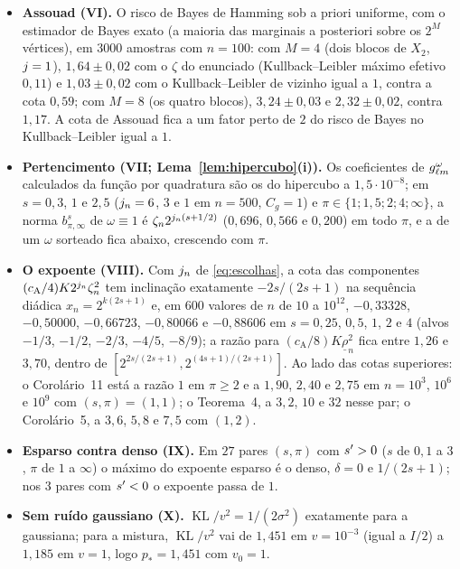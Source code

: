 \documentclass[11pt,a4paper]{article}
\newcommand{\rlow}{\underline{\rho}_{n}}
\newcommand{\cA}{c_{\mathrm{A}}}
\newcommand{\KL}{\operatorname{KL}}
\begin{document}
\begin{itemize}[nosep, leftmargin=*]
    longe de $\gamma/2 = 0{,}03$; a cota \eqref{eq:evento} não é posta à prova
    neste desenho.
  \item \textbf{Assouad (VI).} O risco de Bayes de Hamming sob a priori
    uniforme, com o estimador de Bayes exato (a maioria das marginais a
    posteriori sobre os $2^{M}$ vértices), em $3000$ amostras com $n = 100$:
    com $M = 4$ (dois blocos de $X_{2}$, $j = 1$), $1{,}64 \pm 0{,}02$ com o
    $\zeta$ do enunciado (Kullback--Leibler máximo efetivo $0{,}11$) e
    $1{,}03 \pm 0{,}02$ com o Kullback--Leibler de vizinho igual a $1$, contra a
    cota $0{,}59$; com $M = 8$ (os quatro blocos), $3{,}24 \pm 0{,}03$ e
    $2{,}32 \pm 0{,}02$, contra $1{,}17$. A cota de Assouad fica a um fator
    perto de $2$ do risco de Bayes no Kullback--Leibler igual a $1$.
  \item \textbf{Pertencimento (VII; Lema~\ref{lem:hipercubo}(i)).} Os
    coeficientes de $g_{\ell m}^{\omega}$ calculados da função por
    quadratura são os do hipercubo a $1{,}5\cdot10^{-8}$; em $s = 0{,}3$, $1$ e
    $2{,}5$ ($j_{n} = 6$, $3$ e $1$ em $n = 500$, $C_{g} = 1$) e $\pi \in
    \{1; 1{,}5; 2; 4; \infty\}$, a norma $b^{s}_{\pi,\infty}$ de $\omega \equiv
    1$ é $\zeta_{n}2^{j_{n}(s+1/2)}$ ($0{,}696$, $0{,}566$ e $0{,}200$) em
    todo $\pi$, e a de um $\omega$ sorteado fica abaixo, crescendo com $\pi$.
  \item \textbf{O expoente (VIII).} Com $j_{n}$ de \eqref{eq:escolhas}, a
    cota das componentes $(\cA/4)K2^{\lev_{n}}\zeta_{n}^{2}$ tem inclinação
    exatamente $-2s/(2s+1)$ na sequência diádica $x_{n} = 2^{k(2s+1)}$ e, em
    $600$ valores de $n$ de $10$ a $10^{12}$, $-0{,}33328$, $-0{,}50000$,
    $-0{,}66723$, $-0{,}80066$ e $-0{,}88606$ em $s = 0{,}25$, $0{,}5$, $1$, $2$
    e $4$ (alvos $-1/3$, $-1/2$, $-2/3$, $-4/5$, $-8/9$); a razão para
    $(\cA/8)K\rlow^{2}$ fica entre $1{,}26$ e $3{,}70$, dentro de $[2^{2s/(2s+1)},
    2^{(4s+1)/(2s+1)}]$. Ao lado das cotas superiores: o Corolário~11 está a
    razão $1$ em $\pi \ge 2$ e a $1{,}90$, $2{,}40$ e $2{,}75$ em $n = 10^{3}$,
    $10^{6}$ e $10^{9}$ com $(s,\pi) = (1,1)$; o Teorema~4, a $3{,}2$, $10$ e
    $32$ nesse par; o Corolário~5, a $3{,}6$, $5{,}8$ e $7{,}5$ com $(1,2)$.
  \item \textbf{Esparso contra denso (IX).} Em $27$ pares $(s,\pi)$ com
    $s' > 0$ ($s$ de $0{,}1$ a $3$, $\pi$ de $1$ a $\infty$) o máximo do
    expoente esparso é o denso, $\delta = 0$ e $1/(2s+1)$; nos $3$ pares com
    $s' < 0$ o expoente passa de $1$.
  \item \textbf{Sem ruído gaussiano (X).} $\KL/v^{2} = 1/(2\sigma^{2})$
    exatamente para a gaussiana; para a mistura, $\KL/v^{2}$ vai de $1{,}451$
    em $v = 10^{-3}$ (igual a $I/2$) a $1{,}185$ em $v = 1$, logo $p_{*} =
    1{,}451$ com $v_{0} = 1$.
\end{itemize}
\end{document}
